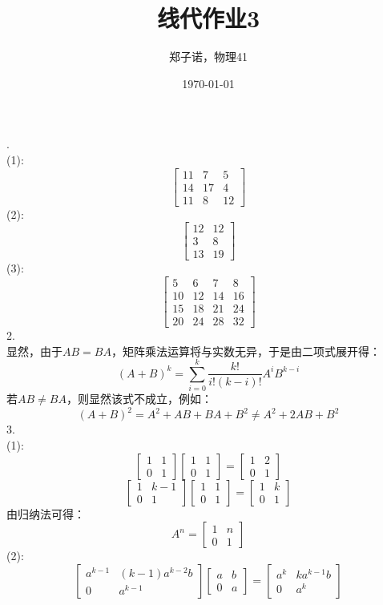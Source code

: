 \documentclass[utf8]{ctexart}
\title{线代作业3}
\author{郑子诺，物理41}
\date{\today}
\begin{document}
\maketitle
{}.\\
(1):\[\begin{bmatrix}
	11&7&5\\
	14&17&4\\
	11&8&12
\end{bmatrix}\]
(2):\[\begin{bmatrix}
	12&12\\
	3&8\\
	13&19
\end{bmatrix}\]
(3):\[\begin{bmatrix}
	5&6&7&8\\
	10&12&14&16\\
	15&18&21&24\\
	20&24&28&32
\end{bmatrix}\]
2.\\
显然，由于$AB=BA$，矩阵乘法运算将与实数无异，于是由二项式展开得：
\[(A+B)^k=\sum\limits_{i=0}^{k}\frac{k!}{i!(k-i)!}A^iB^{k-i}\]
若$AB\neq BA$，则显然该式不成立，例如：
\[(A+B)^2=A^2+AB+BA+B^2\neq A^2+2AB+B^2\]
3.\\
(1):\\
\[\begin{bmatrix}
	1&1\\
	0&1
\end{bmatrix}
\begin{bmatrix}
    1&1\\
    0&1
\end{bmatrix}
=
\begin{bmatrix}
	1&2\\
	0&1
\end{bmatrix}\]
\[\begin{bmatrix}
	1&k-1\\
	0&1
\end{bmatrix}
\begin{bmatrix}
	1&1\\
	0&1
\end{bmatrix}
=
\begin{bmatrix}
	1&k\\
	0&1
\end{bmatrix}\]
由归纳法可得：
\[A^n=
\begin{bmatrix}
	1&n\\
	0&1
\end{bmatrix}\]
(2):\\
\[\begin{bmatrix}
	a^{k-1}&(k-1)a^{k-2}b\\
	0&a^{k-1}
\end{bmatrix}
\begin{bmatrix}
	a&b\\
	0&a
\end{bmatrix}
=
\begin{bmatrix}
	a^k&ka^{k-1}b\\
	0&a^k
\end{bmatrix}\]
\end{document}
